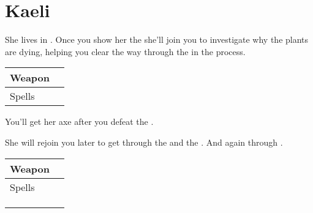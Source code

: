 \section{Kaeli}
\label{char:kaeli}


She lives in . Once you show her the  she'll join you to investigate why the plants are dying, helping you clear the way through the  in the process.

\bigskip
\begin{tabular}{ l | l }
	Weapon & \nameref{weapon:axe} \\
	\hline
	Spells & \nameref{spell:life}
\end{tabular}
\bigskip

You'll get her axe after you defeat the .

\bigskip

She will rejoin you later to get through the  and the . And again through .

\bigskip
\begin{tabular}{ l | l }
	Weapon & \nameref{weapon:giants_axe} \\
	\hline
	Spells & \nameref{spell:cure} \\
	& \nameref{spell:heal} \\
	& \nameref{spell:life} \\
	& \nameref{spell:aero}
\end{tabular}
\bigskip

